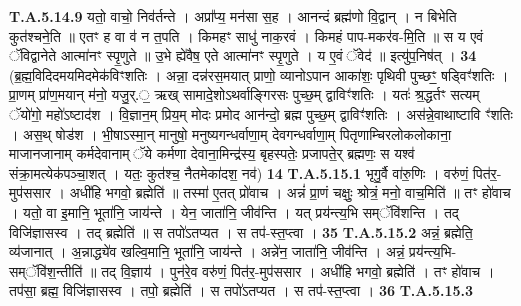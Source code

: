 \documentclass[17pt]{extarticle}
\begin{document}
                  \newline
                                                                  \textbf{ T.A.5.14.9} \newline
                  यतो॒ वाचो॒ निव॑र्तन्ते । अप्रा᳚प्य॒ मन॑सा स॒ह । आनन्दं ब्रह्म॑णो वि॒द्वान् । न बिभेति कुत॑श्चने॒ति ॥ एतꣳ ह वा व॑ न त॒पति । किमहꣳ साधु॑ नाक॒रवं । किमहं पाप-मकर॑व-मि॒ति ॥  स य एवं ॅविद्वानेते आत्मा॑नꣳ स्पृ॒णुते ॥  उ॒भे ह्ये॑वैष॒ एते आत्मा॑नꣳ स्पृ॒णुते ।  य ए॒वं ॅवेद॑ ॥ इत्यु॑प॒निष॑त् । \textbf{ 34} \newline
                  \newline
                                                        (ब्र॒ह्म॒विदिदमयमिदमेक॑विꣳशतिः ।  अन्ना॒ दन्न॑रस॒मयात् प्राणो॒ व्यानोऽपान आका॑शः॒ पृथिवी पुच्छꣳ॒॒ षड्विꣳ॑शतिः ।  प्रा॒णम् प्रा॑ण॒मयान् म॑नो॒ यजु॒र्.॒ ऋख् सामादे॒शोऽथर्वाङ्गिरसः पुच्छ॒म् द्वाविꣳ॑शतिः ।  यतः॑ श्र॒द्धर्तꣳ सत्यम् ॅयो॑गो॒ महो॑ऽष्टाद॑श । वि॒ज्ञान॒म् प्रिय॒म् मोदः प्रमोद आन॑न्दो॒ ब्रह्म पुच्छ॒म् द्वाविꣳ॑शतिः ।  अस॑न्ने॒वाथाष्टावि ꣳ॑शतिः । अस॒थ् षोड॑श ।  भी॒षाऽस्मा॒न् मानुषो॒ मनुष्यगन्धर्वाणा॒म् देवगन्धर्वाणा॒म् पितृणाम्चिरलोकलोकाना॒ माजानजानाम् कर्मदेवानाम् ॅये कर्मणा देवाना॒मिन्द्र॑स्य॒ बृहस्पतेः॒ प्रजापते॒र् ब्रह्मणः॒ स यश्व॑ संक्रा॒मत्येक॑पञ्चा॒शत् ।  यतः॒ कुत॑श्च॒ नैतमेका॑दश॒ नव॑) \textbf{14} \newline \newline
                                \textbf{ T.A.5.15.1} \newline
                  भृगु॒र्वै वा॑रु॒णिः । वरु॑णं॒ पित॑र॒-मुप॑ससार । अधी॑हि भगवो॒ ब्रह्मेति॑ ॥ तस्मा॑ ए॒तत् प्रो॑वाच । अन्नं॑ प्रा॒णं चक्षुः॒ श्रोत्रं॒ मनो॒ वाच॒मिति॑ ॥  तꣳ हो॑वाच । यतो॒ वा इ॒मानि॒ भूता॑नि॒ जाय॑न्ते ।  येन॒ जाता॑नि॒ जीव॑न्ति । यत् प्रय॑न्त्य॒भि सम्ॅवि॑शन्ति ।  तद् विजि॑ज्ञासस्व । तद् ब्रह्मेति॑ ॥  स तपो॑ऽतप्यत । स तप॑-स्त॒प्त्वा । \textbf{ 35} \newline
                  \newline
                                                                  \textbf{ T.A.5.15.2} \newline
                  अन्नं॒ ब्रह्मेति॒ व्य॑जानात् । अ॒न्नाद्ध्ये॑व खल्वि॒मानि॒ भूता॑नि॒ जाय॑न्ते । अन्ने॑न॒ जाता॑नि॒ जीव॑न्ति । अन्नं॒ प्रय॑न्त्य॒भि-सम्ॅवि॑श॒न्तीति॑ ॥ तद् वि॒ज्ञाय॑ । पुन॑रे॒व वरु॑णं॒ पित॑र॒-मुप॑ससार । अधी॑हि भगवो॒ ब्रह्मेति॑ । तꣳ हो॑वाच । तप॑सा॒ ब्रह्म॒ विजि॑ज्ञासस्व ।  तपो॒ ब्रह्मेति॑ । स तपो॑ऽतप्यत । स तप॑-स्त॒प्त्वा । \textbf{ 36} \newline
                  \newline
                                                                  \textbf{ T.A.5.15.3} \newline
\end{document}
